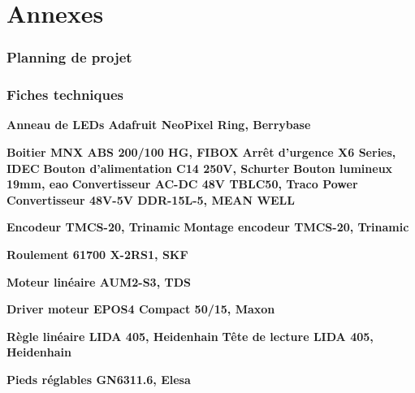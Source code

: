 \section*{Annexes}
\subsubsection*{Planning de projet}
\subsubsection*{Fiches techniques}

\textbf{Anneau de LEDs Adafruit NeoPixel Ring, Berrybase}

\textbf{Boitier MNX ABS 200/100 HG, FIBOX}
\newline \textbf{Arrêt d'urgence X6 Series, IDEC}
\newline \textbf{Bouton d'alimentation C14 250V, Schurter}
\newline \textbf{Bouton lumineux 19mm, eao}
\newline \textbf{Convertisseur AC-DC 48V TBLC50, Traco Power}
\newline \textbf{Convertisseur 48V-5V DDR-15L-5, MEAN WELL}

\textbf{Encodeur TMCS-20, Trinamic}
\newline
\textbf{Montage encodeur TMCS-20, Trinamic}

\textbf{Roulement 61700 X-2RS1, SKF}

\textbf{Moteur linéaire AUM2-S3, TDS}

\textbf{Driver moteur EPOS4 Compact 50/15, Maxon}

\textbf{Règle linéaire LIDA 405, Heidenhain}
\newline
\textbf{Tête de lecture LIDA 405, Heidenhain}

\textbf{Pieds réglables GN6311.6, Elesa}